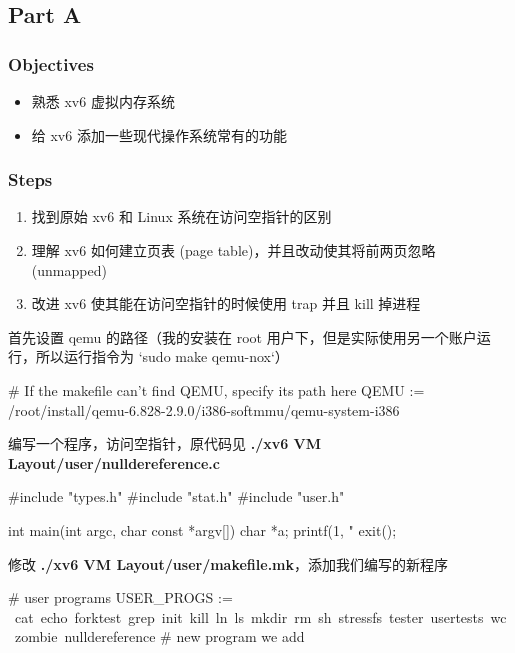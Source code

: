 \subsection{Part A}
\subsubsection{Objectives}

\begin{itemize}
    \item 熟悉 xv6 虚拟内存系统
    \item 给 xv6 添加一些现代操作系统常有的功能
\end{itemize}

\subsubsection{Steps}

\begin{enumerate}
    \item 找到原始 xv6 和 Linux 系统在访问空指针的区别
    \item 理解 xv6 如何建立页表 (page table)，并且改动使其将前两页忽略 (unmapped)
    \item 改进 xv6 使其能在访问空指针的时候使用 trap 并且 kill 掉进程
\end{enumerate}

首先设置 qemu 的路径（我的安装在 root 用户下，但是实际使用另一个账户运行，所以运行指令为 `sudo make qemu-nox`）
\begin{textcode}
# If the makefile can't find QEMU, specify its path here
QEMU := /root/install/qemu-6.828-2.9.0/i386-softmmu/qemu-system-i386
\end{textcode}

编写一个程序，访问空指针，原代码见 \textbf{./xv6 VM Layout/user/nulldereference.c}

\begin{ccode}
#include "types.h"
#include "stat.h"
#include "user.h"

int main(int argc, char const *argv[])
{
    char *a;
    printf(1, "%
    exit();
}
\end{ccode}

修改 \textbf{./xv6 VM Layout/user/makefile.mk}，添加我们编写的新程序

\begin{bashcode}
# user programs
USER_PROGS := \
    cat\
    echo\
    forktest\
    grep\
    init\
    kill\
    ln\
    ls\
    mkdir\
    rm\
    sh\
    stressfs\
    tester\
    usertests\
    wc\
    zombie\
    nulldereference # new program we add
\end{bashcode}

